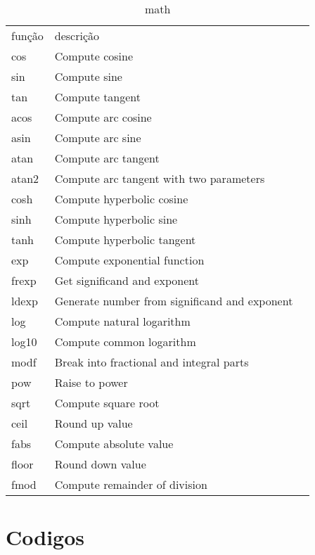 \documentclass[a4paper,twocolumn, 10pt, landscape]{article}
\begin{document}
\begin{table}
 \begin{tabular}{lll}
função & descrição \\
cos &	 Compute cosine  \\
sin &	Compute sine  \\
tan &	Compute tangent  \\
acos &	Compute arc cosine  \\
asin &	Compute arc sine  \\
atan &	Compute arc tangent  \\
atan2 &	Compute arc tangent with two parameters  \\
cosh &	Compute hyperbolic cosine  \\
sinh &	Compute hyperbolic sine  \\
tanh &	Compute hyperbolic tangent  \\
exp &	Compute exponential function  \\
frexp &	Get significand and exponent  \\
ldexp &	Generate number from significand and exponent  \\
log &	Compute natural logarithm  \\
log10 &	Compute common logarithm  \\
modf &	Break into fractional and integral parts  \\
pow &	Raise to power  \\
sqrt &	Compute square root  \\
ceil &	Round up value  \\
fabs &	Compute absolute value  \\
floor &	Round down value  \\
fmod &	Compute remainder of division  \\
\end{tabular}
\caption{math}
\label{math functions}
\end{table}

\section{Codigos}
\end{document}
